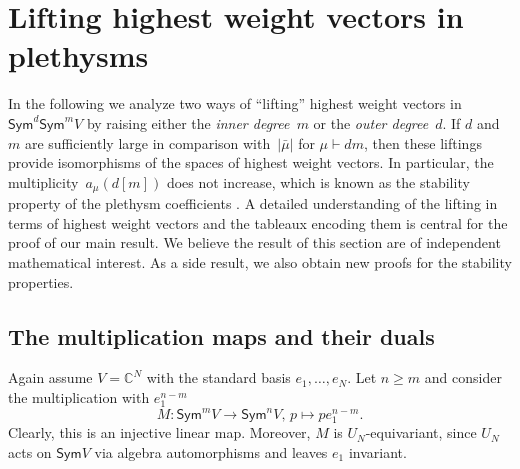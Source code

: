 \documentclass[11pt]{amsart}
\def\C{\mathbb{C}}
\def\GL{\mathrm{GL}}
\def\Sym{\mathsf{Sym}}
\def\ot{\otimes}
\newcommand{\aS}{\ensuremath{\mathfrak{S}}}
\numberwithin{equation}{section}
\begin{document}
\section{Lifting highest weight vectors in plethysms}\label{sec:kllifting}


In the following we analyze two ways of ``lifting'' highest weight vectors 
in $\Sym^d\Sym^m V$ by raising either the {\em inner degree~$m$} 
or the {\em outer degree}~$d$. 
If $d$ and $m$ are sufficiently large in comparison with~$|\bar\mu|$
for $\mu \vdash dm$, 
then these liftings provide isomorphisms of the 
spaces of highest weight vectors. In particular, the multiplicity~$a_\mu(d[m])$ does not increase, 
which is known as the stability property of the plethysm coefficients
\cite{wei:90,carre-thibon:92,mani:98}. 
A detailed understanding of the lifting in terms of highest weight vectors 
and the tableaux encoding them 
is central for the proof of our main result. 
We believe the result of this section are of independent mathematical interest. 
As a side result, we also obtain new proofs for the stability properties. 


\subsection{The multiplication maps and their duals}

Again assume $V=\C^N$ with the standard basis $e_1,\ldots,e_N$. 
Let $n\ge m$ and consider the multiplication with $e_1^{n-m}$ %
\begin{equation}\label{eq:Me1}
 M\colon\Sym^m V \to \Sym^n V,\, p \mapsto p e_1^{n-m}  . %
\end{equation}
Clearly, this is an injective linear map. 
Moreover, $M$ is $U_N$-equivariant, 
since $U_N$ acts on $\Sym V$ via algebra automorphisms and leaves $e_1$ invariant.

\end{document}
